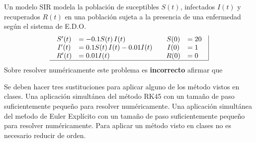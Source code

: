\begin{pregunta}
\begin{cuerpo}
Un modelo SIR modela la poblaci\'on de suceptibles $S(t)$, infectados $I(t)$ y recuperados $R(t)$ en una poblaci\'on sujeta a la presencia de una enfermedad seg\'un el sistema de E.D.O.
$$
\begin{array}{c|}
\begin{array}{cl}
S'(t)	&=-0.1 S(t)\, I(t)\\
I'(t)	&=0.1 S(t)\, I(t)-0.01I(t)\\
R'(t)	&=0.01I(t)
\end{array}
\quad
\begin{array}{cl}
S(0)	&=20\\
I(0)	&=1\\
R(0)	&=0
\end{array} \\
\hline
\end{array}
$$
Sobre resolver num\'ericamente este problema es \textbf{incorrecto} afirmar que
\end{cuerpo}

\begin{multicols}{2}
\begin{alternativas}
{Se deben hacer tres sustituciones para aplicar alguno de los m\'etodo vistos en clases.}
{Una aplicaci\'on simult\'anea del m\'etodo RK45 con un tamaño de paso suficientemente pequeño para resolver num\'ericamente.}
{Una aplicaci\'on simult\'anea del me\'todo de Euler Expl\'icito con un tamaño de paso suficientemente pequeño para resolver num\'ericamente.}
{Para aplicar un m\'etodo visto en clases no es necesario reducir de orden.}
\end{alternativas}
\end{multicols}
\justificacion{0cm}
\end{pregunta}